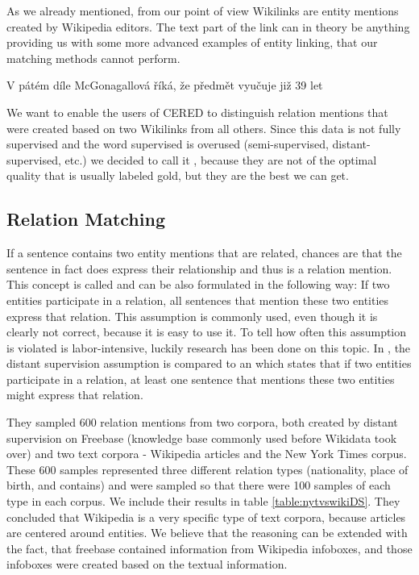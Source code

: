 As we already mentioned, from our point of view Wikilinks are entity mentions created by Wikipedia editors. The text part of the link can in theory be anything providing us with some more advanced examples of entity linking, that our matching methods cannot perform.

V pátém díle McGonagallová říká, že předmět vyučuje již 39 let

We want to enable the users of CERED to distinguish relation mentions that were created based on two Wikilinks from all others. Since this data is not fully supervised and the word supervised is overused (semi-supervised, distant-supervised, etc.) we decided to call it , because they are not of the optimal quality that is usually labeled gold, but they are the best we can get.


\subsection{Relation Matching}
If a sentence contains two entity mentions that are related, chances are that the sentence in fact does express their relationship and thus is a relation mention. This concept is called  and can be also formulated in the following way: If two entities participate in a relation, all sentences that  mention these two entities express that relation. This assumption is commonly used, even though it is clearly not correct, because it is easy to use it. To tell how often this assumption is violated is labor-intensive, luckily research has been done on this topic. In \citep{nytdistant}, the distant supervision assumption is compared to an  which states that if two entities participate in a relation, at least one sentence that mentions these two entities might express that relation. 

They sampled 600 relation mentions from two corpora, both created by distant supervision on Freebase (knowledge base commonly used before Wikidata took over) and two text corpora - Wikipedia articles and the New York Times corpus. These 600 samples represented three different relation types (nationality, place of birth, and contains) and were sampled so that there were 100 samples of each type in each corpus. We include their results in table \autoref{table:nytvswikiDS}. They concluded that Wikipedia is a very specific type of text corpora, because articles are centered around entities. We believe that the reasoning can be extended with the fact, that freebase contained information from Wikipedia infoboxes, and those infoboxes were created based on the textual information. 

